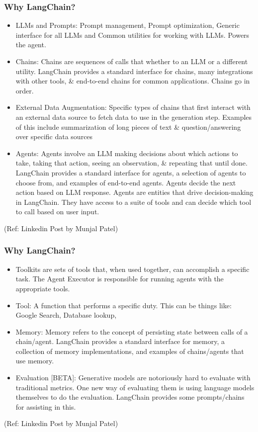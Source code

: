 \begin{frame}\frametitle{Why LangChain?}

\begin{itemize}
\item LLMs and Prompts: Prompt management, Prompt optimization, Generic interface for all LLMs and Common utilities for working with LLMs. Powers the agent.
\item Chains: Chains are sequences of calls that whether to an LLM or a different utility. LangChain provides a standard interface for chains, many integrations with other tools, \& end-to-end chains for common applications. Chains go in order.
\item External Data Augmentation: Specific types of chains that first interact with an external data source to fetch data to use in the generation step. Examples of this include summarization of long pieces of text \& question/answering over specific data sources
\item Agents: Agents involve an LLM making decisions about which actions to take, taking that action, seeing an observation, \& repeating that until done. LangChain provides a standard interface for agents, a selection of agents to choose from, and examples of end-to-end agents. Agents decide the next action based on LLM response. Agents are entities that drive decision-making in LangChain. They have access to a suite of tools and can decide which tool to call based on user input. 
\end{itemize}

{\tiny (Ref: Linkedin Post by Munjal Patel)}
\end{frame}


\begin{frame}\frametitle{Why LangChain?}

\begin{itemize}
\item Toolkits are sets of tools that, when used together, can accomplish a specific task. The Agent Executor is responsible for running agents with the appropriate tools.
\item Tool: A function that performs a specific duty. This can be things like: Google Search, Database lookup,
\item Memory: Memory refers to the concept of persisting state between calls of a chain/agent. LangChain provides a standard interface for memory, a collection of memory implementations, and examples of chains/agents that use memory.
\item Evaluation [BETA]: Generative models are notoriously hard to evaluate with traditional metrics. One new way of evaluating them is using language models themselves to do the evaluation. LangChain provides some prompts/chains for assisting in this.
\end{itemize}

{\tiny (Ref: Linkedin Post by Munjal Patel)}
\end{frame}


